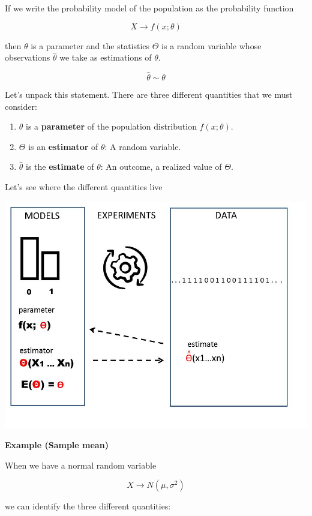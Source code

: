 \documentclass[
]{book}
\providecommand{\tightlist}{%
  \setlength{\itemsep}{0pt}\setlength{\parskip}{0pt}}
\begin{document}
If we write the probability model of the population as the probability function

\[X \rightarrow f(x; \theta)\]

then \(\theta\) is a parameter and the statistics \(\Theta\) is a random variable whose observations \(\hat{\theta}\) we take as estimations of \(\theta\).

\[\hat{\theta} \sim \theta\]

Let's unpack this statement. There are three different quantities that we must consider:

\begin{enumerate}
\def\labelenumi{\arabic{enumi}.}
\tightlist
\item
  \(\theta\) is a \textbf{parameter} of the population distribution \(f(x; \theta)\).
\item
  \(\Theta\) is an \textbf{estimator} of \(\theta\): A random variable.
\item
  \(\hat{\theta}\) is the \textbf{estimate} of \(\theta\): An outcome, a realized value of \(\Theta\).
\end{enumerate}

Let's see where the different quantities live

\includegraphics{./figures/estimator.JPG}

\textbf{Example (Sample mean)}

When we have a normal random variable

\[X \rightarrow N(\mu, \sigma^2)\]

we can identify the three different quantities:
\end{document}
